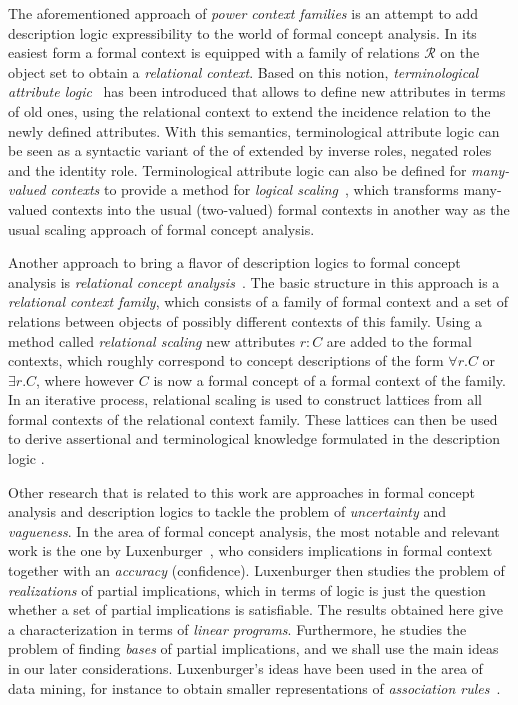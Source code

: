 The aforementioned approach of \emph{power context families} is an attempt to add
description logic expressibility to the world of formal concept analysis.  In its easiest
form a formal context is equipped with a family of relations $\mathcal{R}$ on the object
set to obtain a \emph{relational context}.  Based on this notion, \emph{terminological
  attribute logic}~\cite{books/math/Prediger00} has been introduced that allows to define
new attributes in terms of old ones, using the relational context to extend the incidence
relation to the newly defined attributes.  With this semantics, terminological attribute
logic can be seen as a syntactic variant of the of \ALC extended by inverse roles, negated
roles and the identity role.  Terminological attribute logic can also be defined for
\emph{many-valued contexts} to provide a method for \emph{logical
  scaling}~\cite{conf/krdb/PredigerS99}, which transforms many-valued contexts into the
usual (two-valued) formal contexts in another way as the usual scaling approach of formal
concept analysis.

Another approach to bring a flavor of description logics to formal concept analysis is
\emph{relational concept analysis}~\cite{conf/icfca/RouaneHNV07,
  journals/amai/HaceneHNV13}.  The basic structure in this approach is a \emph{relational
  context family}, which consists of a family of formal context and a set of relations
between objects of possibly different contexts of this family.  Using a method called
\emph{relational scaling} new attributes $r : C$ are added to the formal contexts, which
roughly correspond to concept descriptions of the form $\forall r. C$ or $\exists r. C$,
where however $C$ is now a formal concept of a formal context of the family.  In an
iterative process, relational scaling is used to construct lattices from all formal
contexts of the relational context family.  These lattices can then be used to derive
assertional and terminological knowledge formulated in the description logic \FLE.

Other research that is related to this work are approaches in formal concept analysis and
description logics to tackle the problem of \emph{uncertainty} and \emph{vagueness}.  In
the area of formal concept analysis, the most notable and relevant work is the one by
Luxenburger~\cite{diss:Luxenburger,Luxenburger91}, who considers implications in formal
context together with an \emph{accuracy} (confidence).  Luxenburger then studies the
problem of \emph{realizations} of partial implications, which in terms of logic is just
the question whether a set of partial implications is satisfiable.  The results obtained
here give a characterization in terms of \emph{linear programs}.  Furthermore, he studies
the problem of finding \emph{bases} of partial implications, and we shall use the main
ideas in our later considerations.  Luxenburger's ideas have been used in the area of data
mining, for instance to obtain smaller representations of \emph{association
  rules}~\cite{DBLP:conf/ki/StummeTBPL01}.

